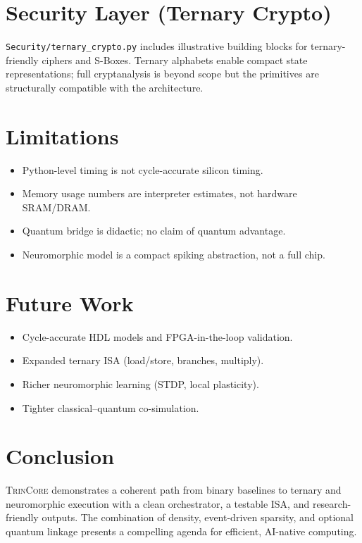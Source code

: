 \documentclass[11pt,a4paper]{article}
\newcommand{\project}{\textsc{TrinCore}}
\newcommand{\code}[1]{\texttt{#1}}
\begin{document}
\section{Security Layer (Ternary Crypto)}
\label{sec:security}
\code{Security/ternary\_crypto.py} includes illustrative building blocks for
ternary-friendly ciphers and S-Boxes. Ternary alphabets enable compact state
representations; full cryptanalysis is beyond scope but the primitives are
structurally compatible with the architecture.

\section{Limitations}
\label{sec:limits}
\begin{itemize}[leftmargin=1.25em]
  \item Python-level timing is not cycle-accurate silicon timing.
  \item Memory usage numbers are interpreter estimates, not hardware SRAM/DRAM.
  \item Quantum bridge is didactic; no claim of quantum advantage.
  \item Neuromorphic model is a compact spiking abstraction, not a full chip.
\end{itemize}

\section{Future Work}
\label{sec:future}
\begin{itemize}[leftmargin=1.25em]
  \item Cycle-accurate HDL models and FPGA-in-the-loop validation.
  \item Expanded ternary ISA (load/store, branches, multiply).
  \item Richer neuromorphic learning (STDP, local plasticity).
  \item Tighter classical--quantum co-simulation.
\end{itemize}

\section{Conclusion}
\label{sec:conclusion}
\project{} demonstrates a coherent path from binary baselines to ternary
and neuromorphic execution with a clean orchestrator, a testable ISA, and
research-friendly outputs. The combination of density, event-driven sparsity,
and optional quantum linkage presents a compelling agenda for efficient,
AI-native computing.
\end{document}
